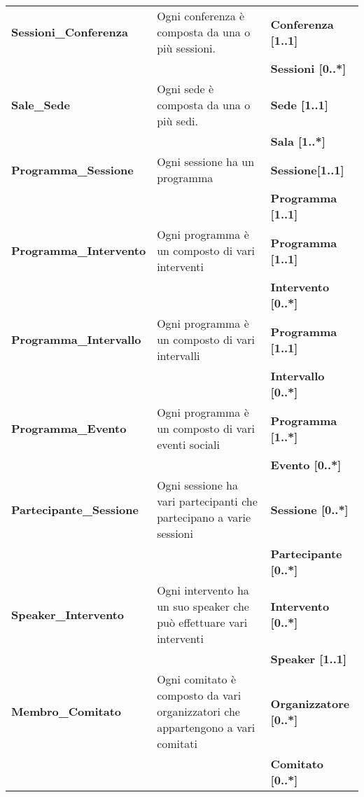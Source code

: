 \begin{longtable}{|p{}|p{}|p{}|}
	\hline
	\textbf{Sessioni\_Conferenza} & Ogni conferenza è composta da una o più sessioni. & \textbf{Conferenza [1..1]} \\
	& & \textbf{Sessioni [0..*]} \\ \hline
	\textbf{Sale\_Sede} & Ogni sede è composta da una o più sedi. & \textbf{Sede [1..1]} \\
	& & \textbf{Sala [1..*]} \\ \hline
	\textbf{Programma\_Sessione} & Ogni sessione ha un programma & \textbf{Sessione[1..1]} \\
	& & \textbf{Programma [1..1]} \\ \hline
	\textbf{Programma\_Intervento} & Ogni programma è un composto di vari interventi & \textbf{Programma [1..1]} \\
	& & \textbf{Intervento [0..*]} \\ \hline
	\textbf{Programma\_Intervallo} & Ogni programma è un composto di vari intervalli & \textbf{Programma [1..1]} \\
	& & \textbf{Intervallo [0..*]} \\ \hline
	\textbf{Programma\_Evento} & Ogni programma è un composto di vari eventi sociali & \textbf{Programma [1..*]} \\
	& & \textbf{Evento [0..*]} \\ \hline
	\textbf{Partecipante\_Sessione} & Ogni sessione ha vari partecipanti che partecipano a varie sessioni & \textbf{Sessione [0..*]}\\
	& & \textbf{Partecipante [0..*]} \\ \hline
	\textbf{Speaker\_Intervento} & Ogni intervento ha un suo speaker che può effettuare vari interventi & \textbf{Intervento [0..*]}\\
	& & \textbf{Speaker [1..1]} \\ \hline
	\textbf{Membro\_Comitato} & Ogni comitato è composto da vari organizzatori che appartengono a vari comitati & \textbf{Organizzatore [0..*]} \\ & & \textbf{Comitato [0..*]} \\
	\hline
\end{longtable}